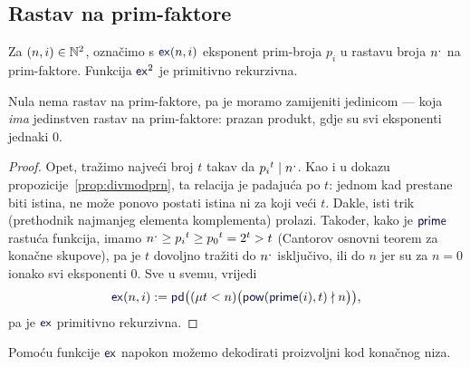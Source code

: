 \subsection{Rastav na prim-faktore}
\begin{lema}[{name=[primitivna rekurzivnost rastava na prim-faktore]}]\label{lm:exprn}
Za $(n,i)\in{\mathbb N}^2$, označimo s $\f{ex}(n,i)$ eksponent prim-broja $p_i$ u rastavu broja $n\sp{\text{\normalsize.}}$ na prim-faktore. Funkcija $\f{ex}^2$ je primitivno rekurzivna.
\end{lema}
Nula nema rastav na prim-faktore, pa je moramo zamijeniti jedinicom --- koja \emph{ima} jedinstven rastav na prim-faktore: prazan produkt, gdje su svi eksponenti jednaki $0$.
\begin{proof}
Opet, tražimo najveći broj $t$ takav da ${p_i}^t\mid n\sp{\text{\normalsize.}}$. Kao i u dokazu propozicije~\ref{prop:divmodprn}, ta relacija je padajuća po $t$: jednom kad prestane biti istina, ne može ponovo postati istina ni za koji veći $t$. Dakle, isti trik (prethodnik najmanjeg elementa komplementa) prolazi. Također, kako je $\f{prime}$ rastuća funkcija, imamo $n\sp{\text{\normalsize.}}\ge{p_i}^t\ge{p_0}^t=2^t>t$ (Cantorov osnovni teorem za konačne skupove), pa je $t$ dovoljno tražiti do $n\sp{\text{\normalsize.}}$ isključivo, ili do $n$ jer su za $n=0$ ionako svi eksponenti $0$. Sve u svemu, vrijedi
\begin{equation}
    \f{ex}(n,i):=\f{pd}\bigl((\mu t<n)\bigl(\f{pow}(\f{prime}(i),t)\nmid n\bigr)\bigr)\text,
\end{equation}
pa je $\f{ex}$ primitivno rekurzivna.
\end{proof}

Pomoću funkcije $\f{ex}$ napokon možemo dekodirati proizvoljni kod konačnog niza.

